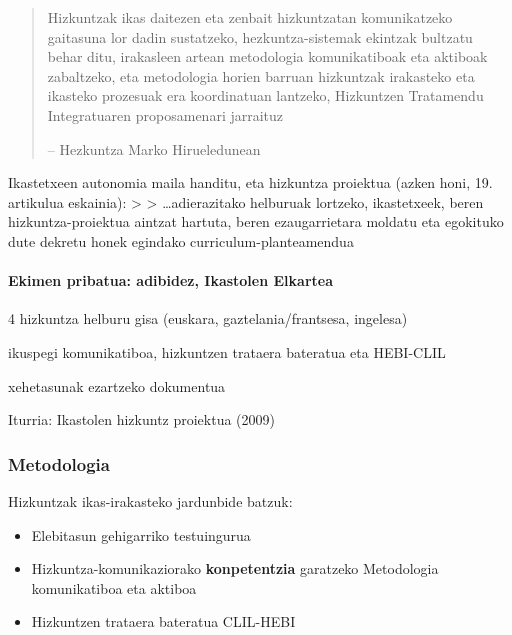 \documentclass[
]{book}
\providecommand{\tightlist}{%
  \setlength{\itemsep}{0pt}\setlength{\parskip}{0pt}}
\begin{document}
\begin{quote}
Hizkuntzak ikas daitezen eta zenbait hizkuntzatan komunikatzeko gaitasuna lor dadin sustatzeko, hezkuntza-sistemak ekintzak bultzatu behar ditu, irakasleen artean metodologia komunikatiboak eta aktiboak zabaltzeko, eta metodologia horien barruan hizkuntzak irakasteko eta ikasteko prozesuak era koordinatuan lantzeko, Hizkuntzen Tratamendu Integratuaren proposamenari jarraituz

-- Hezkuntza Marko Hirueledunean
\end{quote}

Ikastetxeen autonomia maila handitu, eta hizkuntza proiektua (azken honi, 19. artikulua eskainia):
\textgreater{}
\textgreater{} \ldots adierazitako helburuak lortzeko, ikastetxeek, beren hizkuntza-proiektua aintzat hartuta, beren ezaugarrietara moldatu eta egokituko dute dekretu honek egindako curriculum-planteamendua

\hypertarget{ekimen-pribatua-adibidez-ikastolen-elkartea}{%
\paragraph{Ekimen pribatua: adibidez, Ikastolen Elkartea}\label{ekimen-pribatua-adibidez-ikastolen-elkartea}}

\begin{description}
\tightlist
\item[Eleaniztasunaz]
4 hizkuntza helburu gisa (euskara, gaztelania/frantsesa, ingelesa)
\item[Metodologiaz]
ikuspegi komunikatiboa, hizkuntzen trataera bateratua eta HEBI-CLIL
\item[Ikastetxearen Hizkuntza Proiektua]
xehetasunak ezartzeko dokumentua
\end{description}

Iturria: Ikastolen hizkuntz proiektua (2009)

\hypertarget{metodologia}{%
\subsubsection{Metodologia}\label{metodologia}}

Hizkuntzak ikas-irakasteko jardunbide batzuk:

\begin{itemize}
\tightlist
\item
  Elebitasun gehigarriko testuingurua
\item
  Hizkuntza-komunikaziorako \textbf{konpetentzia} garatzeko
  Metodologia komunikatiboa eta aktiboa
\item
  Hizkuntzen trataera bateratua
  CLIL-HEBI
\end{itemize}
\end{document}
